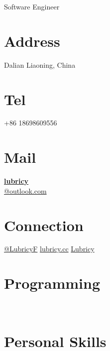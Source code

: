 \documentclass[]{friggeri-cv}
\begin{document}
      {Software Engineer}
\begin{flushright}
\emph{\date}
\end{flushright}
      

\begin{aside}
  \section{Address}
    Dalian
    Liaoning, China
    ~
  \section{Tel}
    \faMobile+86 18698609556
    ~
  \section{Mail}
    \faEnvelopeO\href{mailto:lubricy@outlook.com}{\textbf{lubricy}\\@outlook.com}
    ~
  \section{Connection}
    \faTwitter\href{https://twitter.com/LubricyF}{@LubricyF}
    \faGlobe\href{http://lubricy.cc}{lubricy.cc}
    \faGithub\href{https://github.com/Lubricy}{Lubricy}
    ~
  \section{Programming}
    ~
  \section{Personal Skills}
    ~

\end{aside}
\end{document}
